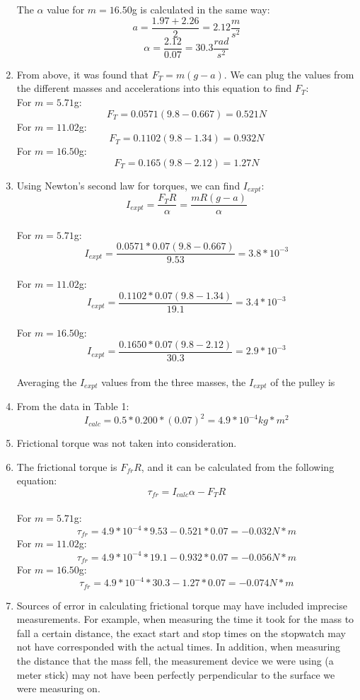 \documentclass[10pt, letterpaper]{article}
\begin{document}
\begin{enumerate}
      The $\alpha $ value for $m = 16.50$g is calculated in the same way: \\[3]
      \[ a = \frac{1.97 + 2.26}{2} = 2.12 \frac{m}{s^2} \]
      \[\alpha = \frac{2.12}{0.07} = \boxed{30.3 \frac{rad}{s^2}} \]
  \item From above, it was found that $F_T = m(g-a)$. We can plug the values from the different masses and accelerations into this equation to find $F_T$: \\
    For $m = 5.71$g:
      \[ F_T = 0.0571(9.8 - 0.667) = \boxed{0.521 N} \]
    For $m = 11.02$g:
      \[ F_T = 0.1102(9.8 - 1.34) = \boxed{0.932 N} \]
    For $m = 16.50$g:
      \[ F_T = 0.165(9.8 - 2.12) =  \boxed{1.27 N} \]
  \item Using Newton's second law for torques, we can find $I_{expt}$:
    \[ I_{expt} = \frac{F_{T}R}{\alpha } = \frac{mR(g-a)}{\alpha } \] \\
    For $m = 5.71$g:
      \[ I_{expt} = \frac{0.0571*0.07(9.8 - 0.667)}{9.53} = 3.8 * 10^{-3} \] \\
    For $m = 11.02$g:
      \[ I_{expt} = \frac{0.1102*0.07(9.8 - 1.34)}{19.1} = 3.4 * 10^{-3}\] \\
    For $m = 16.50$g:
      \[ I_{expt} = \frac{0.1650*0.07(9.8 - 2.12)}{30.3} = 2.9 * 10^{-3} \] \\
    Averaging the $I_{expt}$ values from the three masses, the $I_{expt}$ of the pulley is 
  \item From the data in Table 1:
      \[I_{calc} = 0.5*0.200*(0.07)^2 = \boxed{4.9 * 10^{-4} kg*m^2} \]
  \item Frictional torque was not taken into consideration.
  \item The frictional torque is $F_{fr}R$, and it can be calculated from the following equation:
    \[ \tau _{fr} = I_{calc}\alpha - F_{T}R \] \\
    For $m = 5.71$g:
      \[ \tau _{fr} = 4.9*10^{-4}*9.53 - 0.521*0.07 = \boxed{-0.032 N*m} \]
    For $m = 11.02$g:
      \[ \tau _{fr} = 4.9*10^{-4}*19.1 - 0.932*0.07 = \boxed{-0.056 N*m} \]
    For $m = 16.50$g:
      \[ \tau _{fr} = 4.9*10^{-4}*30.3 - 1.27*0.07 = \boxed{-0.074 N*m} \]
  \item Sources of error in calculating frictional torque may have included imprecise measurements. For example, when measuring the time
        it took for the mass to fall a certain distance, the exact start and stop times on the stopwatch may not have corresponded with the
        actual times. In addition, when measuring the distance that the mass fell, the measurement device we were using (a meter stick) may
        not have been perfectly perpendicular to the surface we were measuring on.
\end{enumerate}
\end{document}

